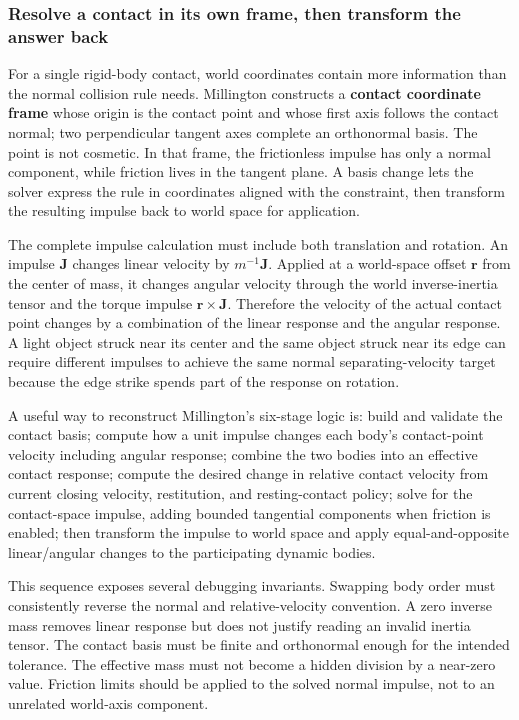 \subsubsection{Resolve a contact in its own frame, then transform the answer back}\label{06-engine-ii-ch046-resolve-a-contact-in-its-own-frame-then-transform-the-answer-back}

\hypertarget{06-engine-ii-ch046-resolve-a-contact-in-its-own-frame-then-transform-the-answer-back}{}

For a single rigid-body contact, world coordinates contain more information than the normal collision rule needs. Millington constructs a \textbf{contact coordinate frame} whose origin is the contact point and whose first axis follows the contact normal; two perpendicular tangent axes complete an orthonormal basis. The point is not cosmetic. In that frame, the frictionless impulse has only a normal component, while friction lives in the tangent plane. A basis change lets the solver express the rule in coordinates aligned with the constraint, then transform the resulting impulse back to world space for application.

The complete impulse calculation must include both translation and rotation. An impulse \(\mathbf{J}\) changes linear velocity by \(m^{-1}\mathbf{J}\). Applied at a world-space offset \(\mathbf{r}\) from the center of mass, it changes angular velocity through the world inverse-inertia tensor and the torque impulse \(\mathbf{r}\times\mathbf{J}\). Therefore the velocity of the actual contact point changes by a combination of the linear response and the angular response. A light object struck near its center and the same object struck near its edge can require different impulses to achieve the same normal separating-velocity target because the edge strike spends part of the response on rotation.

A useful way to reconstruct Millington's six-stage logic is: build and validate the contact basis; compute how a unit impulse changes each body's contact-point velocity including angular response; combine the two bodies into an effective contact response; compute the desired change in relative contact velocity from current closing velocity, restitution, and resting-contact policy; solve for the contact-space impulse, adding bounded tangential components when friction is enabled; then transform the impulse to world space and apply equal-and-opposite linear/angular changes to the participating dynamic bodies.

This sequence exposes several debugging invariants. Swapping body order must consistently reverse the normal and relative-velocity convention. A zero inverse mass removes linear response but does not justify reading an invalid inertia tensor. The contact basis must be finite and orthonormal enough for the intended tolerance. The effective mass must not become a hidden division by a near-zero value. Friction limits should be applied to the solved normal impulse, not to an unrelated world-axis component.

